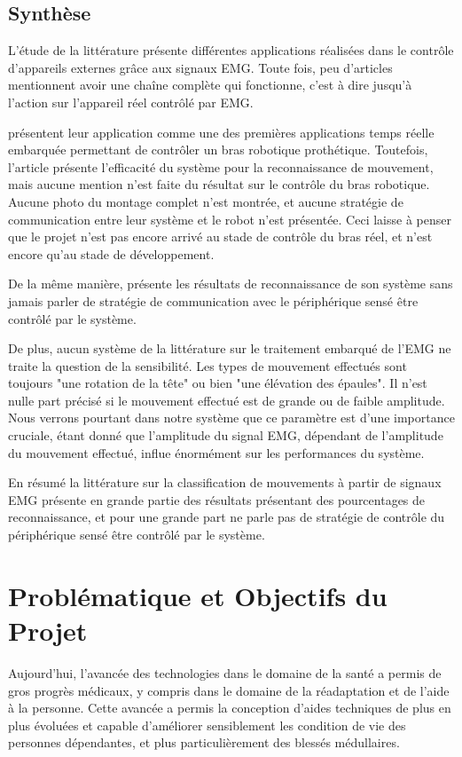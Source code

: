 \documentclass[letterpaper, twoside, 12pt, memoire, creativecommons, hyperref]{thETS}
\begin{document}
\section{Synthèse}

L'étude de la littérature présente différentes applications réalisées dans le contrôle d'appareils externes grâce aux signaux EMG. Toute fois, peu d'articles mentionnent avoir une chaîne complète qui fonctionne, c'est à dire jusqu'à l'action sur l'appareil réel contrôlé par EMG.

\cite{Tenore2007} présentent leur application comme une des premières applications temps réelle embarquée permettant de contrôler un bras robotique prothétique. Toutefois, l'article présente l'efficacité du système pour la reconnaissance de mouvement, mais aucune mention n'est faite du résultat sur le contrôle du bras robotique. Aucune photo du montage complet n'est montrée, et aucune stratégie de communication entre leur système et le robot n'est présentée. Ceci laisse à penser que le projet n'est pas encore arrivé au stade de contrôle du bras réel, et n'est encore qu'au stade de développement. 

De la même manière, \cite{Chang1996} présente les résultats de reconnaissance de son système sans jamais parler de stratégie de communication avec le périphérique sensé être contrôlé par le système. 

De plus, aucun système de la littérature sur le traitement embarqué de l'EMG ne traite la question de la sensibilité. Les types de mouvement effectués sont toujours "une rotation de la tête" ou bien "une élévation des épaules". Il n'est nulle part précisé si le mouvement effectué est de grande ou de faible amplitude. Nous verrons pourtant dans notre système que ce paramètre est d'une importance cruciale, étant donné que l'amplitude du signal EMG, dépendant de l'amplitude du mouvement effectué, influe énormément sur les performances du système.

En résumé la littérature sur la classification de mouvements à partir de signaux EMG présente en grande partie des résultats présentant des pourcentages de reconnaissance, et pour une grande part ne parle pas de stratégie de contrôle du périphérique sensé être contrôlé par le système. 

\chapter{Problématique et Objectifs du Projet}

Aujourd'hui, l'avancée des technologies dans le domaine de la santé a permis de gros progrès médicaux, y compris dans le domaine de la réadaptation et de l'aide à la personne. Cette avancée a permis la conception d'aides techniques de plus en plus évoluées et capable d'améliorer sensiblement les condition de vie des personnes dépendantes, et plus particulièrement des blessés médullaires. 
\end{document}
